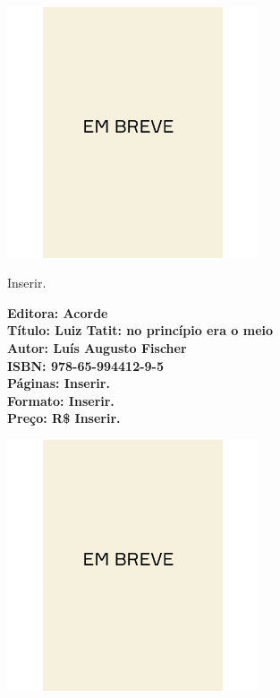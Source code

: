 \pagestyle{acorde}
\label{acorde}

\begin{center}
\hspace*{.5cm}\includegraphics[width=74mm]{./CAPAS/breve.jpeg}
\end{center}
\hspace*{-7cm}\hrulefill\hspace*{-7cm}
\medskip

\noindent{}Inserir.

\vfill
\hspace*{-.4cm}\begin{minipage}[c]{.5\linewidth}
\small\textbf{
\hspace*{-.1cm}Editora: Acorde\\
Título: Luiz Tatit: no princípio era o meio\\
Autor: Luís Augusto Fischer\\ 
ISBN: 978-65-994412-9-5\\
Páginas: Inserir.\\
Formato: Inserir.\\
Preço: R\$ Inserir.\\
}
\end{minipage}
\pagebreak

\begin{center}
\hspace*{.5cm}\includegraphics[width=74mm]{./CAPAS/breve.jpeg}
\end{center}
\hspace*{-7cm}\hrulefill\hspace*{-7cm}
\medskip

